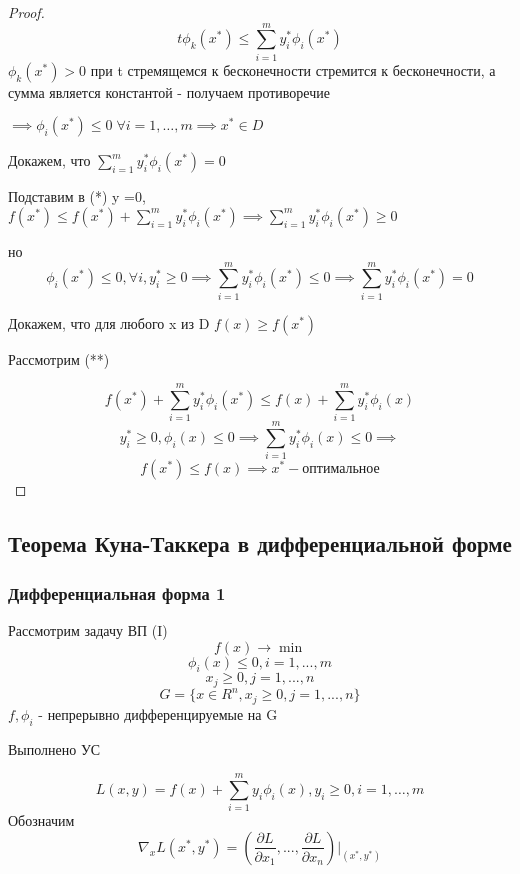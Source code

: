 \documentclass[a4paper]{article}
\theoremstyle{definition}
\theoremstyle{remark}
\begin{document}
\begin{proof}
    \[t\phi_k(x^*) \le \sum_{i = 1}^m y_i^* \phi_i(x^*)\]
    $\phi_k(x^*)>0$ при t стремящемся к бесконечности стремится к бесконечности, а сумма является константой - получаем противоречие

    $\implies \phi_i(x^*)\le 0 \; \forall i = 1, \dots, m\implies x^* \in D$

    Докажем, что $\sum_{i = 1}^m y_i^* \phi_i(x^*) = 0$
    
    Подставим в (*) y =0, $f(x^*)\le f(x^*) + \sum_{i = 1}^m y_i^* \phi_i(x^*) \implies \sum_{i = 1}^m y_i^* \phi_i(x^*) \ge 0$
    
    но \[\phi_i(x^*)\le 0 , \forall i, y^*_i\ge0 \implies \sum_{i = 1}^m y_i^* \phi_i(x^*) \le 0 \implies \sum_{i = 1}^m y_i^* \phi_i(x^*) = 0\]
    
    Докажем, что для любого x из D $f(x)\ge f(x^*)$

    Рассмотрим (**)

    \[f(x^*) + \sum_{i = 1}^m y_i^* \phi_i(x^*) \le f(x) + \sum_{i = 1}^m y_i^* \phi_i(x)\]
    \[y^*_i \ge0, \phi_i(x)\le 0\implies \sum_{i = 1}^m y_i^* \phi_i(x)\le 0 \implies\]
    \[f(x^*)\le f(x)\implies x^* - \textbf{оптимальное}\]
\end{proof}
\subsection{Теорема Куна-Таккера в дифференциальной форме}
\subsubsection{Дифференциальная форма 1}
Рассмотрим задачу ВП  (I)
\[f(x)\to \min\]
\[\phi_i(x)\le 0, i = 1, ..., m\]
\[x_j \ge 0, j = 1, ..., n\]
\[G = \{x\in R^n, x_j \ge 0, j = 1, ..., n\}\]
$f, \phi_i$ - непрерывно дифференцируемые на G

Выполнено УС

\[L(x, y) = f(x) +\sum_{i = 1}^{m}y_i \phi_i(x), y_i\ge 0 , i = 1, \dots, m\]
Обозначим \[\nabla_x L(x^*, y^*) = (\frac{\partial L}{\partial x_1}, ..., \frac{\partial L}{\partial x_n})|_{(x^*, y^*)}\]
\end{document}
